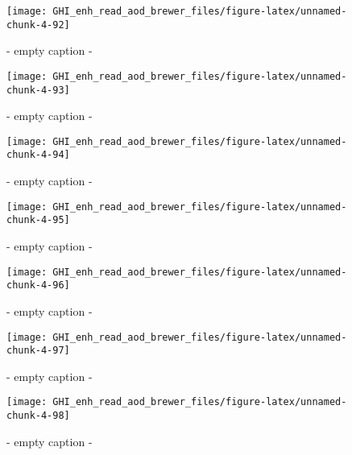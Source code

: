 \documentclass[
  10pt,
  a4paper,oneside]{article}
\begin{document}
\begin{figure}[H]

{\centering \texttt{[image: GHI\_enh\_read\_aod\_brewer\_files/figure-latex/unnamed-chunk-4-92]} 

}

\caption{ - empty caption - }\label{fig:unnamed-chunk-4-92}
\end{figure}
\begin{figure}[H]

{\centering \texttt{[image: GHI\_enh\_read\_aod\_brewer\_files/figure-latex/unnamed-chunk-4-93]} 

}

\caption{ - empty caption - }\label{fig:unnamed-chunk-4-93}
\end{figure}
\begin{figure}[H]

{\centering \texttt{[image: GHI\_enh\_read\_aod\_brewer\_files/figure-latex/unnamed-chunk-4-94]} 

}

\caption{ - empty caption - }\label{fig:unnamed-chunk-4-94}
\end{figure}
\begin{figure}[H]

{\centering \texttt{[image: GHI\_enh\_read\_aod\_brewer\_files/figure-latex/unnamed-chunk-4-95]} 

}

\caption{ - empty caption - }\label{fig:unnamed-chunk-4-95}
\end{figure}
\begin{figure}[H]

{\centering \texttt{[image: GHI\_enh\_read\_aod\_brewer\_files/figure-latex/unnamed-chunk-4-96]} 

}

\caption{ - empty caption - }\label{fig:unnamed-chunk-4-96}
\end{figure}
\begin{figure}[H]

{\centering \texttt{[image: GHI\_enh\_read\_aod\_brewer\_files/figure-latex/unnamed-chunk-4-97]} 

}

\caption{ - empty caption - }\label{fig:unnamed-chunk-4-97}
\end{figure}
\begin{figure}[H]

{\centering \texttt{[image: GHI\_enh\_read\_aod\_brewer\_files/figure-latex/unnamed-chunk-4-98]} 

}

\caption{ - empty caption - }\label{fig:unnamed-chunk-4-98}
\end{figure}
\end{document}
